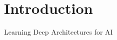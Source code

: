 
\chapter{Introduction}
\label{cha:intro}

Learning Deep Architectures for AI \cite{Bengio2009}




